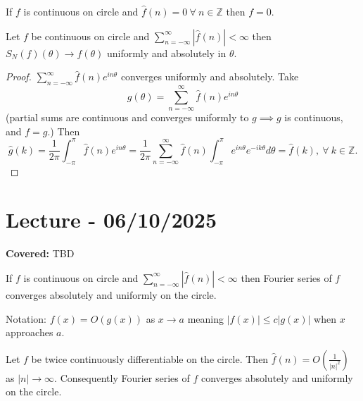 \documentclass{functionspaces}
\begin{document}
\begin{corollary}\label{cor:fourier_uniqueness_continuous}
If $f$ is continuous on circle and $\hat{f}(n)=0\ \forall\ n\in\mathbb{Z}$ then $f=0$.
\end{corollary}

\begin{corollary}\label{cor:fourier_abs_convergence}
Let $f$ be continuous on circle and $\sum_{n=-\infty}^{\infty}\left|\hat{f}(n)\right|<\infty$ then $S_{N}(f)(\theta)\to f(\theta)$ uniformly and absolutely in $\theta$.
\end{corollary}

\begin{proof}
$\sum_{n=-\infty}^{\infty}\hat{f}(n)e^{in\theta}$ converges uniformly and absolutely. Take
\[
g(\theta)=\sum_{n=-\infty}^{\infty}\hat{f}(n)e^{in\theta}
\]
(partial sums are continuous and converges uniformly to $g\implies g$ is continuous, and $f=g$.) Then
\[
\hat{g}(k)=\frac{1}{2\pi}\int_{-\pi}^{\pi}\hat{f}(n)e^{in\theta}=\frac{1}{2\pi}\sum_{n=-\infty}^{\infty}\hat{f}(n)\int_{-\pi}^{\pi}e^{in\theta}e^{-ik\theta}d\theta=\hat{f}(k),\ \forall\ k\in\mathbb{Z}.
\]
\end{proof}

\setlength{\parindent}{0pt}
\endgroup

\newpage
\section{Lecture - 06/10/2025}

\textbf{Covered:} TBD

\begingroup
\setlength{\parskip}{6pt}

\begin{corollary}\label{cor:abs_unif_convergence}
If $f$ is continuous on circle and $\sum_{n=-\infty}^{\infty}\left|\hat{f}(n)\right|<\infty$ then Fourier series of $f$ converges absolutely and uniformly on the circle.
\end{corollary}

Notation: $f(x)=O(g(x))$ as $x\to a$ meaning $\left|f(x)\right|\leq c\left|g(x)\right|$ when $x$ approaches $a$.

\begin{corollary}\label{cor:twice_diff_fourier}
Let $f$ be twice continuously differentiable on the circle. Then $\hat{f}(n)=O\left(\frac{1}{\left|n\right|^{2}}\right)$ as $\left|n\right|\rightarrow\infty$. Consequently Fourier series of $f$ converges absolutely and uniformly on the circle.
\end{corollary}
\end{document}
